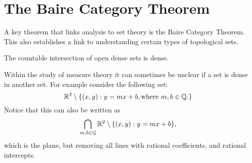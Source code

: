 \section{The Baire Category Theorem}
A key theorem that links analysis to set theory is the Baire Category Theorem.  This also establishes a link to understanding certain types of topological sets.  
\begin{theorem}
    The countable intersection of open dense sets is dense.  
\end{theorem}

Within the study of measure theory it can sometimes be unclear if a set is dense in another set.  For example consider the following set: 
$$\mathbb{R}^2 \setminus \{(x,y): y=mx + b, \text{where $m, b \in \mathbb{Q}$.}\}$$
Notice that this can also be written as $$\bigcap_{m,b \in \mathbb{Q}} \mathbb{R}^2 \setminus \{(x,y): y=mx+b\}, $$ which is the plane, but removing all lines with rational coefficients, and rational intercepts.  